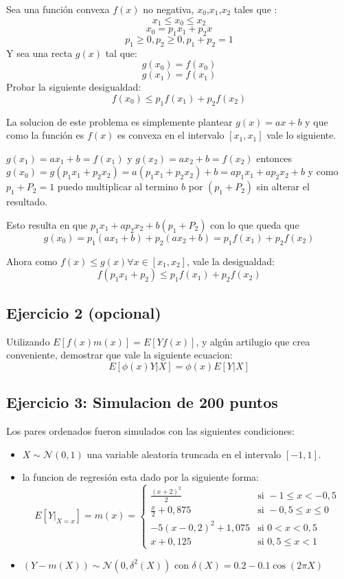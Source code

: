 \documentclass[12pt, a4paper]{article}
\begin{document}
Sea una función convexa $f(x)$ no negativa, $x_0$,$x_1$,$x_2$ tales que :
 		$$x_1 \leq x_0 \leq x_2$$
		$$x_0 = p_1 x_1 + p_2 x$$
		$$p_1 \geq 0, p_2 \geq 0, p_1+p_2 = 1 $$
Y sea una recta $g(x)$ tal que:
		$$g(x_0) = f(x_0)$$
		$$g(x_1) = f(x_1)$$
Probar la siguiente desigualdad:
		$$f(x_0) \leq p_1f(x_1) + p_2f(x_2)$$

La solucion de este problema es simplemente plantear $g(x) = ax+b$ y que como la función es  $f(x)$ es convexa en el intervalo $[x_1, x_1]$ vale lo siguiente.

$g(x_1) = ax_1+b = f(x_1) $ y $g(x_2) = ax_2+b = f(x_2) $ entonces $g(x_0) = g(p_1x_1+p_2x_2)=a(p_1x_1+p_2x_2)+b = ap_1x_1+ap_2x_2+b$ y como $p_1+P_2=1$ puedo multiplicar al termino $b$ por $(p_1+P_2)$ sin alterar el resultado.

Esto resulta en que $p_1x_1+ap_2x_2+b(p_1+P_2)$ con lo que queda que
	$$g(x_0) = p_1(ax_1+b)+p_2(ax_2+b) = p_1f(x_1)+p_2f(x_2)$$

Ahora como $f(x) \leq g(x) \forall x \in [x_1,x_2]$, vale la desigualdad:
	$$f(p_1 x_1 + p_2) \leq p_1f(x_1)+p_2f(x_2)$$

\subsection{Ejercicio 2 (opcional)}

Utilizando $E[f(x)m(x)] = E[Yf(x)]$, y algún artilugio que crea conveniente, demostrar que vale la siguiente ecuacion:
		$$E[\phi(x)Y|X] = \phi(x)E[Y|X]$$

\subsection{Ejercicio 3: Simulacion de 200 puntos}
Los pares ordenados fueron simulados con las siguientes condiciones:
\begin{itemize}
    \item  $X\sim\mathcal{N}(0,1)$ una variable aleatoria truncada en el intervalo $[-1,1]$.
    \item la funcion de regresión esta dado por la siguiente forma:
$$E[Y|_{X=x}]=m(x)=
\begin{cases}
    \frac{(x+2)^2}{2}   &\text{si } -1\leq x<-0,5      \\
    \frac{x}{2} + 0,875 &\text{si } -0,5\leq x \leq 0 \\
    -5(x-0,2)^2 + 1,075 &\text{si } 0 < x < 0,5       \\
    x+0,125             &\text{si } 0,5\leq x <1
\end{cases}
$$
    \item $(Y-m(X))\sim\mathcal{N}(0,\delta^2(X))$ con $\delta(X)=0.2-0.1\cos(2\pi X)$
\end{itemize}
\end{document}
